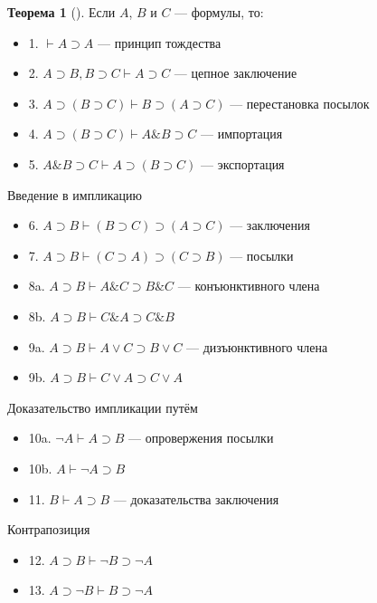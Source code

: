 \documentclass[a4paper, 12pt]{article}  %
\DeclareMathOperator{\conj}{\mathbb{\&}}
\theoremstyle{definition}
\newtheorem{theorem}{Теорема}
\begin{document}
	\newpage
	\begin{theorem}[]
		Если $A$, $B$ и $C$ --- формулы, то:
		\begin{itemize}[label={}]
			\setlength\itemsep{0pt}	
			\item 1. $\vdash A \supset A$ --- принцип тождества
			\item 2. $A \supset B, B \supset C \vdash A \supset C$ --- 
				цепное заключение
			\item 3. $A \supset (B \supset C) \vdash B \supset (A \supset C)$ ---
				перестановка посылок
			\item 4. $A \supset (B \supset C) \vdash A \conj B \supset C$ ---
				импортация
			\item 5. $A \conj B \supset C \vdash A \supset (B \supset C)$ ---
				экспортация
		\end{itemize}
		
		Введение в импликацию
		\begin{itemize}[label={}]
			\setlength\itemsep{0pt}	
			\item 6. $A \supset B \vdash (B \supset C) \supset (A \supset C)$ --- заключения
			\item 7. $A \supset B \vdash (C \supset A) \supset (C \supset B)$ --- посылки
			\item 8a. $A \supset B \vdash A \conj C \supset B \conj C$ ---
				конъюнктивного члена
			\item 8b. $A \supset B \vdash C \conj A \supset C \conj B$
			\item 9a. $A \supset B \vdash A \vee C \supset B \vee C$ ---
				дизъюнктивного члена
			\item 9b. $A \supset B \vdash C \vee A \supset C \vee A$ 
		\end{itemize}
	
		Доказательство импликации путём
		\begin{itemize}[label={}]
			\setlength\itemsep{0pt}	
			\item 10a. $\neg A \vdash A \supset B$ --- опровержения посылки
			\item 10b. $A \vdash \neg A \supset B$
			\item 11. $B \vdash A \supset B$ --- доказательства заключения
		\end{itemize}
	
		Контрапозиция
		\begin{itemize}[label={}]
			\setlength\itemsep{0pt}	
			\item 12. $A \supset B \vdash \neg B \supset \neg A$
			\item 13. $A \supset \neg B \vdash B \supset \neg A$
			

\end{itemize}
\end{theorem}
\end{document}
